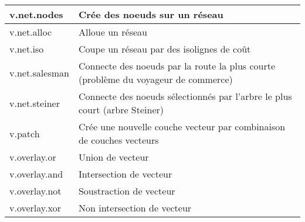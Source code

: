 \begin{table}[ht]
\begin{tabular}{|p{4cm}|p{12cm}|}
  \hline v.net.nodes & Cr\'ee des noeuds sur un r\'eseau\\
  \hline v.net.alloc & Alloue un r\'eseau\\
  \hline v.net.iso & Coupe un r\'eseau par des isolignes de co\^ut\\
  \hline v.net.salesman & Connecte des noeuds par la route la plus courte (probl\`eme du voyageur de commerce) \\
  \hline v.net.steiner & Connecte des noeuds s\'electionn\'es par l'arbre le plus court (arbre Steiner) \\
  \hline v.patch & Cr\'ee une nouvelle couche vecteur par combinaison de couches vecteurs\\
  \hline v.overlay.or & Union de vecteur\\
  \hline v.overlay.and & Intersection de vecteur\\
  \hline v.overlay.not & Soustraction de vecteur \\
  \hline v.overlay.xor & Non intersection de vecteur\\
\hline
\end{tabular}
\end{table}

